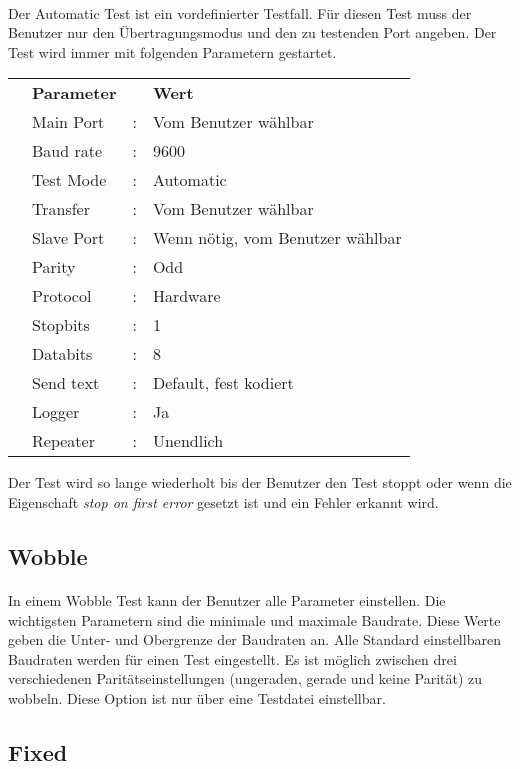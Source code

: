 \paragraph{}
Der Automatic Test ist ein vordefinierter Testfall. Für diesen Test muss der Benutzer nur den Übertragungsmodus und den zu testenden Port angeben. Der Test wird immer mit folgenden Parametern gestartet.
\\
\begin{tabular}{llll}
\\ &\textbf{Parameter} & &\textbf{Wert}
\\ &Main Port &: &Vom Benutzer wählbar
\\ &Baud rate &: &9600
\\ &Test Mode &: &Automatic
\\ &Transfer &: &Vom Benutzer wählbar
\\ &Slave Port &: &Wenn nötig, vom Benutzer wählbar
\\ &Parity &: &Odd
\\ &Protocol &: &Hardware
\\ &Stopbits &: &1
\\ &Databits &: &8
\\ &Send text &: &Default, fest kodiert
\\ &Logger &: &Ja
\\ &Repeater &: &Unendlich
\end{tabular}

Der Test wird so lange wiederholt bis der Benutzer den Test stoppt oder wenn die Eigenschaft \textit{stop on first error} gesetzt ist und ein Fehler erkannt wird.



\subsection{Wobble}
\paragraph{}
In einem Wobble Test kann der Benutzer alle Parameter einstellen. Die wichtigsten Parametern sind die minimale und maximale Baudrate. Diese Werte geben die Unter- und Obergrenze der Baudraten an. Alle Standard einstellbaren Baudraten werden für einen Test eingestellt. Es ist möglich zwischen drei verschiedenen Paritätseinstellungen (ungeraden, gerade und keine Parität) zu wobbeln. Diese Option ist nur über eine Testdatei einstellbar.


\subsection{Fixed}
